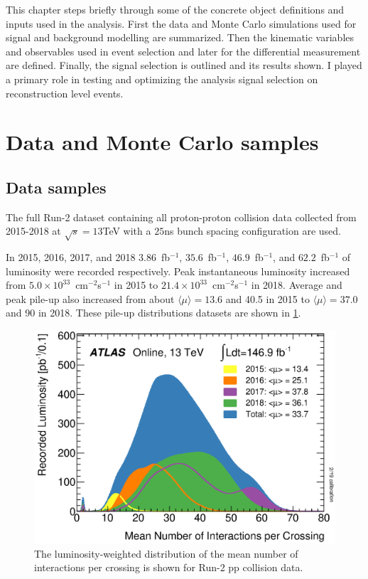 This chapter steps briefly through some of the concrete object definitions and inputs used in the analysis. First the data and Monte Carlo simulations used for signal and background modelling are summarized. Then the kinematic variables and observables used in event selection and later for the differential measurement are defined. Finally, the signal selection is outlined and its results shown. I played a primary role in testing and optimizing the analysis signal selection on reconstruction level events.  

\section{Data and Monte Carlo samples}
\subsection{Data samples}

The full Run-2 dataset containing all proton-proton collision data collected from 2015-2018 at $\sqrt{s}=13$TeV with a $25$ns bunch spacing configuration are used.

In 2015, 2016, 2017, and 2018 $3.86$~fb$^{-1}$, $35.6$~fb$^{-1}$, $46.9$~fb$^{-1}$, and  $62.2$~fb$^{-1}$ of luminosity were recorded respectively. Peak instantaneous luminosity increased from $5.0\times 10^{33}$~cm$^{-2}$s$^{-1}$ in 2015 to $21.4\times 10^{33}$~cm$^{-2}$s$^{-1}$ in 2018. Average and peak pile-up also increased from about $\langle\mu\rangle=13.6$ and 40.5 in 2015 to  $\langle\mu\rangle=37.0$ and 90 in 2018. These pile-up distributions datasets are shown in \ref{fig:mu_profile}. 

\begin{figure}[!htbp]
    \centering 
    \includegraphics[width=0.55\linewidth]{Pictures/mu_2015_2018.eps}
    \caption{The luminosity-weighted distribution of the mean number of interactions per crossing is shown for Run-2 pp collision data. }
    \label{fig:mu_profile}
\end{figure}

